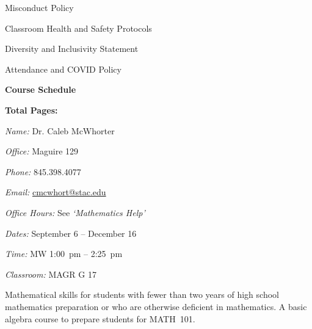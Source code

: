 \documentclass[11pt,letterpaper]{article}
\makeatletter
\newcommand{\classdates}{September 6 -- December 16}
\newcommand{\classtimes}{MW 1:00~pm -- 2:25~pm}
\newcommand{\classroom}{MAGR G 17}
\newcommand{\instructor}{Dr. Caleb McWhorter}
\newcommand{\office}{Maguire 129}
\newcommand{\phone}{845.398.4077}
\newcommand{\email}{cmcwhort@stac.edu}
\newcommand{\officehours}{See \textit{`Mathematics Help'}}
\makeatother
\begin{document}
\begin{minipage}[t]{0.45\textwidth}
\hspace{0.6cm} Misconduct Policy \dotfill \pageref{college_sexmisconduct} \par
\hspace{0.3cm} Classroom Health and Safety Protocols \dotfill \pageref{college_healthsafety} \par
\hspace{0.3cm} Diversity and Inclusivity Statement \dotfill \pageref{college_inclusive} \par
\hspace{0.3cm} Attendance and COVID Policy \dotfill \pageref{college_attnd} \par
{\bfseries\color{stacred} Course Schedule} \dotfill \pageref{schd} \par
\hfill {\bfseries\color{stacred} Total Pages:} \pageref*{LastPage}
\end{minipage}
\sectionbreak









\textit{Name:} \instructor \par
\textit{Office:} \office \par
\textit{Phone:} \phone \par
\textit{Email:} \href{mailto:\email}{\email} \par
\textit{Office Hours:} \officehours 
\sectionbreak



\textit{Dates:} \classdates \par
\textit{Time:} \classtimes \par
\textit{Classroom:} \classroom 
\sectionbreak



Mathematical skills for students with fewer than two years of high school mathematics preparation or who are otherwise deficient in mathematics. A basic algebra course to prepare students for MATH~101.
\sectionbreak
\end{document}
